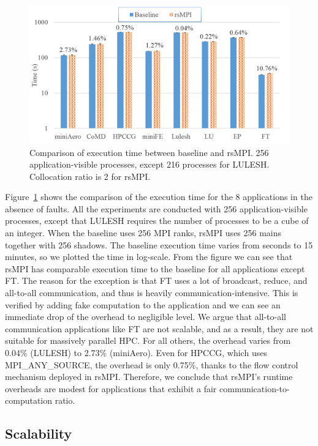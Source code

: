 \begin{figure}[!t]
  \begin{center}
      \includegraphics[width=0.6\columnwidth]{Figures/runtime_overhead}
  \end{center}
  \caption{Comparison of execution time between baseline and rsMPI. 256 application-visible processes, except 216 processes for LULESH. Collocation ratio is 2 for rsMPI.}
  \label{fig:runtime_overhead}
\end{figure}

Figure~\ref{fig:runtime_overhead} shows the comparison of the execution time for the 8 applications in the absence of faults. All the experiments are conducted with 256 application-visible processes, except that LULESH requires the number of processes to be a cube of an integer. When the baseline uses 256 MPI ranks, rsMPI uses 256 mains together with 256 shadows. The baseline execution time varies from seconds to 15 minutes, so we plotted the time in log-scale. 
From the figure we can see that rsMPI has comparable execution time to the baseline for all applications except FT. The reason for the exception is that FT uses a lot of broadcast, reduce, and all-to-all communication, and thus is heavily communication-intensive. This is verified by adding fake computation to the application and we can see an immediate drop of the overhead to negligible level. 
We argue that all-to-all communication applications like FT are not scalable, and as a result, they are not suitable for massively parallel HPC. 
For all others, the overhead varies from 0.04\% (LULESH) to 2.73\% (miniAero). Even for HPCCG, which uses MPI\_ANY\_SOURCE, the overhead is only 0.75\%, thanks to the flow control mechanism deployed in rsMPI. 
Therefore, we conclude that rsMPI's runtime overheads are modest for applications that exhibit a fair communication-to-computation ratio.



\subsection{Scalability}


